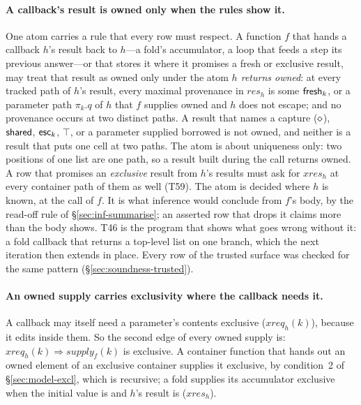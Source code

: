 \paragraph{A callback's result is owned only when the rules show it.} One atom carries a rule that every
row must respect. A function $f$ that hands a callback $h$'s result back to $h$---a fold's accumulator, a
loop that feeds a step its previous answer---or that stores it where it promises a fresh or exclusive
result, may treat that result as owned only under the atom \emph{$h$ returns owned}: at every tracked path
of $h$'s result, every maximal provenance in $\mathit{res}_h$ is some $\mathsf{fresh}_k$, or a parameter path
$\pi_k.q$ of $h$ that $f$ supplies owned and $h$ does not escape; and no provenance occurs at two
distinct paths. A result that names a capture ($\diamond$), $\mathsf{shared}$, $\mathsf{esc}_k$, $\top$, or a parameter
supplied borrowed is not owned, and neither is a result that puts one cell at two paths. The atom is
about uniqueness only: two positions of one list are one path, so a result  built
during the call returns owned. A row that promises an \emph{exclusive} result from $h$'s results must
ask for $\mathit{xres}_h$ at every container path of them as well (T59). The atom is
decided where $h$ is known, at the call of $f$. It is what inference would conclude from $f$'s body, by
the read-off rule of \S\ref{sec:inf-summarise}; an asserted row that drops it claims more than the body
shows. T46 is the program that shows what goes wrong without it: a fold callback that returns a top-level
list on one branch, which the next iteration then extends in place. Every row of the trusted surface was
checked for the same pattern (\S\ref{sec:soundness-trusted}).

\paragraph{An owned supply carries exclusivity where the callback needs it.} A callback may itself need a
parameter's contents exclusive ($\mathit{xreq}_h(k)$), because it edits inside them. So the second edge
of every owned supply is: $\mathit{xreq}_h(k) \Rightarrow \mathit{supply}_f(k)$ is exclusive. A container
function that hands out an owned element of an exclusive container supplies it exclusive, by condition~2
of \S\ref{sec:model-excl}, which is recursive; a fold supplies its accumulator exclusive when the initial
value is and $h$'s result is ($\mathit{xres}_h$).

